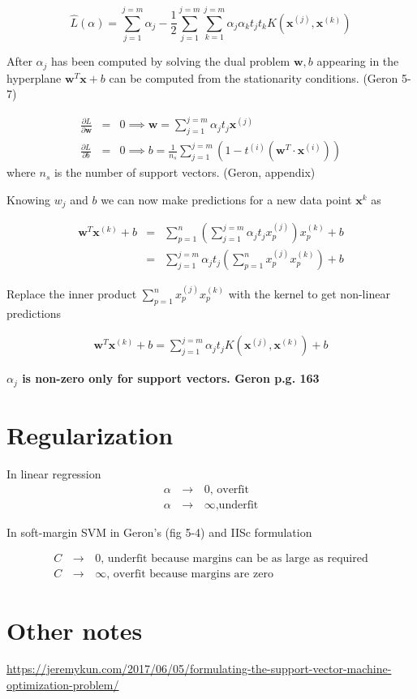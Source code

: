 \documentclass{article}
\newcommand{\beq}{\begin{equation}}
\newcommand{\eeq}{\end{equation}}
\newcommand{\ber}{\begin{eqnarray}}
\newcommand{\eer}{\end{eqnarray}}
\newcommand{\pdd}[2]{\frac{\partial{#1}}{\partial{#2}}}
\begin{document}
\beq
\hat{L}(\alpha) = \sum_{j=1}^{j=m}\alpha_j - \frac{1}{2}\sum_{j=1}^{j=m}\sum_{k=1}^{j=m}\alpha_j\alpha_kt_jt_kK(\pmb{x}^{(j)},\pmb{x}^{(k)})
\eeq

After $\alpha_j$ has been computed by solving the dual problem $\pmb{w},b$ appearing in the hyperplane $\pmb{w}^{T}\pmb{x} + b$ can be computed from the stationarity conditions.
(Geron 5-7)

\ber
\pdd{L}{\pmb{w}} &=& 0 \implies \pmb{w} = \sum_{j=1}^{j=m} \alpha_j t_j \pmb{x}^{(j)} \\
\pdd{L}{b}  &=& 0 \implies b = \frac{1}{n_s}\sum_{j=1}^{j=m} (1-t^{(i)}(\pmb{w}^T\cdot\pmb{x}^{(i)}))
\eer
where $n_s$ is the number of support vectors. (Geron, appendix)

Knowing $w_j$ and $b$ we can now make predictions for a new data point $\pmb{x}^{k}$ as 

\ber
\pmb{w}^T{\pmb{x}^{(k)}} + b &=& \sum_{p=1}^{n}(\sum_{j=1}^{j=m} \alpha_j t_j x_p^{(j)})x^{(k)}_{p} + b \\
&=& \sum_{j=1}^{j=m}  \alpha_j t_j ( \sum_{p=1}^{n}x_p^{(j)}x^{(k)}_{p}) + b
\eer

Replace the inner product $\sum_{p=1}^{n}x_p^{(j)}x^{(k)}_{p}$ with the kernel to get non-linear predictions

\ber
\pmb{w}^T{\pmb{x}^{(k)}} + b = \sum_{j=1}^{j=m}  \alpha_j t_j K(\pmb{x}^{(j)},\pmb{x}^{(k)}) + b
\eer

\textbf{$\alpha_j$ is non-zero only for support vectors. Geron p.g. 163}

\section{ Regularization }

In linear regression
\ber
\alpha\,&\rightarrow&\,{0} \text{, overfit }\\
\alpha\,&\rightarrow&\,{\infty} \text{,underfit}
\eer

In soft-margin SVM in Geron's (fig 5-4) and IISc formulation

\ber
C\,&\rightarrow&\,{0} \text{, underfit because margins can be as large as required} \\
C\,&\rightarrow&\,{\infty} \text{, overfit because margins are zero} 
\eer

\section{Other notes}
\url{https://jeremykun.com/2017/06/05/formulating-the-support-vector-machine-optimization-problem/}
\end{document}
